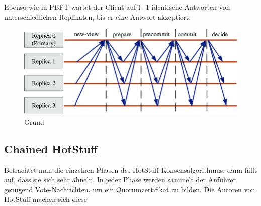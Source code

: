 \documentclass[nonacm,sigconf,natbib=false]{acmart}
\begin{document}
Ebenso wie in PBFT wartet der Client auf f+1 identische Antworten von unterschiedlichen Replikaten, bis er eine Antwort akzeptiert.

\begin{figure}[htbp]
  \centering
  \includegraphics[width=\linewidth]{hotstuff.png}
  \caption{Grund}
  \label{fig:hotstuff}
\end{figure}

\subsection{Chained HotStuff}

Betrachtet man die einzelnen Phasen des HotStuff Konsensalgorithmus, dann fällt auf, dass sie sich sehr ähneln. In jeder Phase werden sammelt der Anführer genügend Vote-Nachrichten, um ein Quorumzertifikat zu bilden. Die Autoren von HotStuff machen sich diese 


\printbibliography
\end{document}
